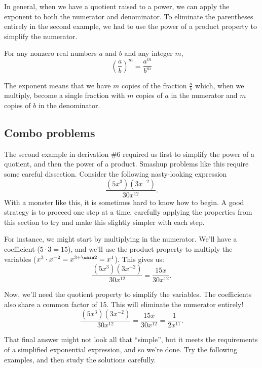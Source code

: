 In general, when we have a quotient raised to a power, we can apply the exponent to both the numerator and denominator. To eliminate the parentheses entirely in the second example, we had to use the power of a product property to simplify the numerator.

\begin{boxeddef}
For any nonzero real numbers $a$ and $b$ and any integer $m$, \[\left(\frac{a}{b}\right)^m = \frac{a^m}{b^m}\]
\end{boxeddef}

The exponent means that we have $m$ copies of the fraction $\frac{a}{b}$ which, when we multiply, become a single fraction with $m$ copies of $a$ in the numerator and $m$ copies of $b$ in the denominator.

\subsection{Combo problems}

The second example in derivation \#6 required us first to simplify the power of a quotient, and then the power of a product. Smashup problems like this require some careful dissection. Consider the following nasty-looking expression
\[\frac{(5x^3)(3x^{-2})}{30x^{12}}.\]
With a monster like this, it is sometimes hard to know how to begin. A good strategy is to proceed one step at a time, carefully applying the properties from this section to try and make this slightly simpler with each step.

For instance, we might start by multiplying in the numerator. We'll have a coefficient ($5\cdot3 = 15$), and we'll use the product property to multiply the variables ($x^3 \cdot x^{-2} = x^{3+\umin2} = x^1$). This gives us:
\[\frac{(5x^3)(3x^{-2})}{30x^{12}} = \frac{15x}{30x^{12}}.\]

Now, we'll need the quotient property to simplify the variables. The coefficients also share a common factor of 15. This will eliminate the numerator entirely!
\[\frac{(5x^3)(3x^{-2})}{30x^{12}} = \frac{15x}{30x^{12}} = \frac{1}{2x^{11}}.\]

That final answer might not look all that ``simple'', but it meets the requirements of a simplified exponential expression, and so we're done. Try the following examples, and then study the solutions carefully.

